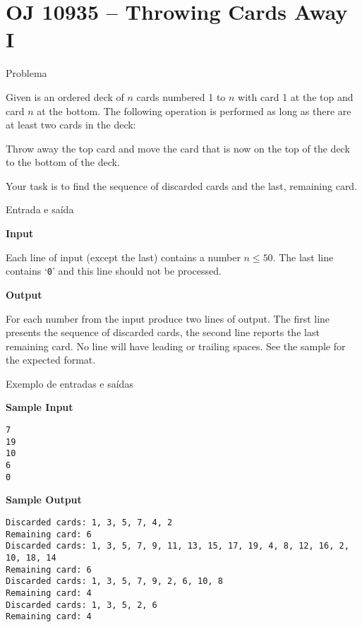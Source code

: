 \section{OJ 10935 -- Throwing Cards Away I}

\begin{frame}[fragile]{Problema}

Given is an ordered deck of $n$ cards numbered 1 to
$n$ with card 1 at the top and card $n$ at the bottom.
The following operation is performed as long as there
are at least two cards in the deck:

\begin{center}
Throw away the top card and move the
card that is now on the top of the deck to
the bottom of the deck.
\end{center}

Your task is to find the sequence of discarded
cards and the last, remaining card.

\end{frame}

\begin{frame}[fragile]{Entrada e saída}

\textbf{Input}

Each line of input (except the last) contains a number
$n\leq 50$. The last line contains ‘\texttt{0}’ and this line should
not be processed.

\textbf{Output}

For each number from the input produce two lines of
output. The first line presents the sequence of discarded cards, the second line reports the last remaining card. No line will have leading or trailing spaces.
See the sample for the expected format.
\end{frame}

\begin{frame}[fragile]{Exemplo de entradas e saídas}

\begin{footnotesize}
\textbf{Sample Input}
\begin{verbatim}
7
19
10
6
0
\end{verbatim}

\textbf{Sample Output}
\begin{verbatim}
Discarded cards: 1, 3, 5, 7, 4, 2
Remaining card: 6
Discarded cards: 1, 3, 5, 7, 9, 11, 13, 15, 17, 19, 4, 8, 12, 16, 2, 10, 18, 14
Remaining card: 6
Discarded cards: 1, 3, 5, 7, 9, 2, 6, 10, 8
Remaining card: 4
Discarded cards: 1, 3, 5, 2, 6
Remaining card: 4
\end{verbatim}
\end{footnotesize}

\end{frame}

